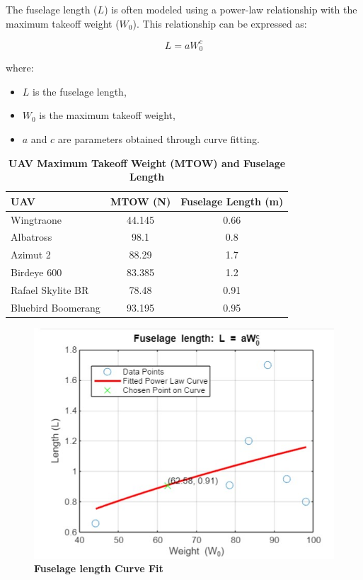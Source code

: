 \documentclass[12 pt]{article}
\begin{document}
{{The fuselage length (\(L\)) is often modeled using a power-law relationship with the maximum takeoff weight (\(W_0\)). This relationship can be expressed as:}

\textbf{\[ L = a W_0^c \]}

where:
\begin{itemize}
    \item \(L\) is the fuselage length,
    \item \(W_0\) is the maximum takeoff weight,
    \item \(a\) and \(c\) are parameters obtained through curve fitting.
\end{itemize}
\begin{table}[htbp]
  \centering
  \caption{\textbf{UAV Maximum Takeoff Weight (MTOW) and Fuselage Length}}
  \begin{tabular}{|l|c|c|}
    \hline
    \textbf{UAV} & \textbf{MTOW (N)} & \textbf{Fuselage Length (m)} \\
    \hline
    Wingtraone & 44.145 & 0.66 \\
    Albatross & 98.1 & 0.8 \\
    Azimut 2 & 88.29 & 1.7 \\
    Birdeye 600 & 83.385 & 1.2 \\
    Rafael Skylite BR & 78.48 & 0.91 \\
    Bluebird Boomerang & 93.195 & 0.95 \\
    \hline
  \end{tabular}
\end{table}
\begin{figure}[H]
    \centering
    \includegraphics[width=\linewidth]{Codes/Week 6/Fuselage length curve fit.jpg}
    \caption{\textbf{Fuselage length Curve Fit}}
    \label{Fuselage length curve fit}
\end{figure}
\color{red}
}
\end{document}

